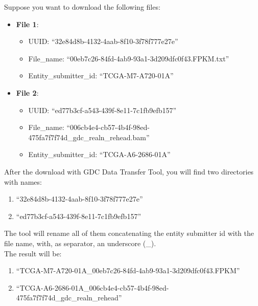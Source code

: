 \documentclass[hidelinks,12pt]{article}
\begin{document}
Suppose you want to download the following files:

\begin{footnotesize}

\begin{itemize}
\item \textbf{File 1}:
	\begin{itemize}
	\item UUID: ``32e84d8b-4132-4aab-8f10-3f78f777e27e''
	\item File\_name: ``00eb7c26-84fd-4ab9-93a1-3d209dfc0f43.FPKM.txt''
	\item Entity\_submitter\_id: ``TCGA-M7-A720-01A''
	\end{itemize}
\end{itemize}



\begin{itemize}
\item \textbf{File 2}:
	\begin{itemize}
	\item UUID: ``ed77b3cf-a543-439f-8e11-7c1fb9efb157''
	\item File\_name: ``006cb4e4-cb57-4b4f-98ed-475fa7f7f74d\_gdc\_realn\_rehead.bam''
	\item Entity\_submitter\_id: ``TCGA-A6-2686-01A''
	\end{itemize}
\end{itemize}
	
\end{footnotesize}

\clearpage

After the download with GDC Data Transfer Tool, you will find two directories with names:

\begin{footnotesize}
\begin{enumerate}
\item ``32e84d8b-4132-4aab-8f10-3f78f777e27e''
\item ``ed77b3cf-a543-439f-8e11-7c1fb9efb157''
\end{enumerate}
\end{footnotesize}

The tool will rename all of them concatenating the entity submitter id with the file name, with, as separator, an underscore (\_). \\ The result will be: 
\begin{footnotesize}
\begin{enumerate}
\item ``TCGA-M7-A720-01A\_00eb7c26-84fd-4ab9-93a1-3d209dfc0f43.FPKM''
\item ``TCGA-A6-2686-01A\_006cb4e4-cb57-4b4f-98ed-475fa7f7f74d\_gdc\_realn\_rehead''
\end{enumerate}
\end{footnotesize}
\end{document}
